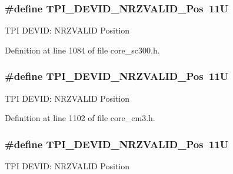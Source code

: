 \subsubsection[{\texorpdfstring{T\+P\+I\+\_\+\+D\+E\+V\+I\+D\+\_\+\+N\+R\+Z\+V\+A\+L\+I\+D\+\_\+\+Pos}{TPI_DEVID_NRZVALID_Pos}}]{\setlength{\rightskip}{0pt plus 5cm}\#define T\+P\+I\+\_\+\+D\+E\+V\+I\+D\+\_\+\+N\+R\+Z\+V\+A\+L\+I\+D\+\_\+\+Pos~11U}\hypertarget{group___c_m_s_i_s___t_p_i_ga9f46cf1a1708575f56d6b827766277f4}{}\label{group___c_m_s_i_s___t_p_i_ga9f46cf1a1708575f56d6b827766277f4}
T\+PI D\+E\+V\+ID\+: N\+R\+Z\+V\+A\+L\+ID Position 

Definition at line 1084 of file core\+\_\+sc300.\+h.

\subsubsection[{\texorpdfstring{T\+P\+I\+\_\+\+D\+E\+V\+I\+D\+\_\+\+N\+R\+Z\+V\+A\+L\+I\+D\+\_\+\+Pos}{TPI_DEVID_NRZVALID_Pos}}]{\setlength{\rightskip}{0pt plus 5cm}\#define T\+P\+I\+\_\+\+D\+E\+V\+I\+D\+\_\+\+N\+R\+Z\+V\+A\+L\+I\+D\+\_\+\+Pos~11U}\hypertarget{group___c_m_s_i_s___t_p_i_ga9f46cf1a1708575f56d6b827766277f4}{}\label{group___c_m_s_i_s___t_p_i_ga9f46cf1a1708575f56d6b827766277f4}
T\+PI D\+E\+V\+ID\+: N\+R\+Z\+V\+A\+L\+ID Position 

Definition at line 1102 of file core\+\_\+cm3.\+h.

\subsubsection[{\texorpdfstring{T\+P\+I\+\_\+\+D\+E\+V\+I\+D\+\_\+\+N\+R\+Z\+V\+A\+L\+I\+D\+\_\+\+Pos}{TPI_DEVID_NRZVALID_Pos}}]{\setlength{\rightskip}{0pt plus 5cm}\#define T\+P\+I\+\_\+\+D\+E\+V\+I\+D\+\_\+\+N\+R\+Z\+V\+A\+L\+I\+D\+\_\+\+Pos~11U}\hypertarget{group___c_m_s_i_s___t_p_i_ga9f46cf1a1708575f56d6b827766277f4}{}\label{group___c_m_s_i_s___t_p_i_ga9f46cf1a1708575f56d6b827766277f4}
T\+PI D\+E\+V\+ID\+: N\+R\+Z\+V\+A\+L\+ID Position 

